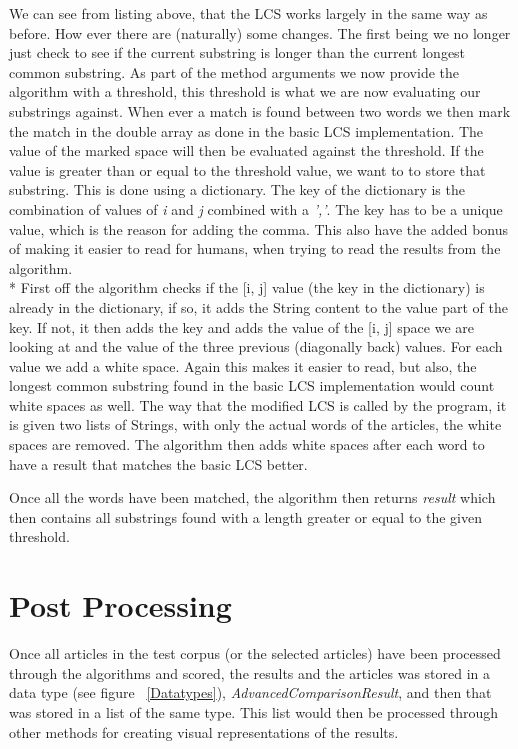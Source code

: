 We can see from listing above, that the LCS works largely in the same way as before. How ever there are (naturally) some changes. The first being we no longer just check to see if the current substring is longer than the current longest common substring. As part of the method arguments we now provide the algorithm with a threshold, this threshold is what we are now evaluating our substrings against. When ever a match is found between two words we then mark the match in the double array as done in the basic LCS implementation. The value of the marked space will then be evaluated against the threshold. If the value is greater than or equal to the threshold value, we want to to store that substring. This is done using a dictionary. The key of the dictionary is the combination of values of \textit{i} and \textit{j} combined with a \textit{','}. The key has to be a unique value, which is the reason for adding the comma. This also have the added bonus of making it easier to read for humans, when trying to read the results from the algorithm.\\* 
First off the algorithm checks if the [i, j] value (the key in the dictionary) is already in the dictionary, if so, it adds the String content to the value part of the key. If not, it then adds the key and adds the value of the [i, j] space we are looking at and the value of the three previous (diagonally back) values. For each value we add a white space. Again this makes it easier to read, but also, the longest common substring found in the basic LCS implementation would count white spaces as well. The way that the modified LCS is called by the program, it is given two lists of Strings, with only the actual words of the articles, the white spaces are removed. The algorithm then adds white spaces after each word to have a result that matches the basic LCS better. 

Once all the words have been matched, the algorithm then returns \textit{result} which then contains all substrings found with a length greater or equal to the given threshold.



\section{Post Processing}
Once all articles in the test corpus (or the selected articles) have been processed through the algorithms and scored, the results and the articles was stored in a data type (see figure ~\ref{Datatypes}), \textit{AdvancedComparisonResult}, and then that was stored in a list of the same type. This list would then be processed through other methods for creating visual representations of the results.

